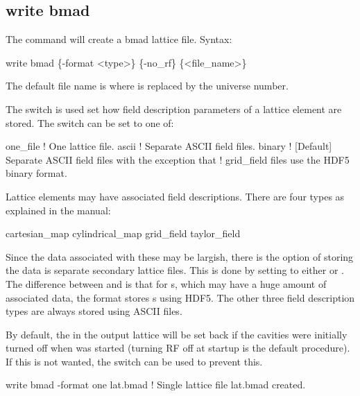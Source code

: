 {{{{{{{{{{{%

\subsection{write bmad}
\label{s:write.bmad}

The  command will create a bmad lattice file. Syntax:
\begin{example}
    write bmad \{-format <type>\} \{-no_rf\} \{<file_name>\} 
\end{example}

The default file name is  where \vn{\#} is replaced by the universe number. 

The  switch is used set how field description parameters of a lattice element
are stored. The  switch can be set to one of:
\begin{example}
  one_file      ! One lattice file.
  ascii         ! Separate ASCII field files.
  binary        ! [Default] Separate ASCII field files with the exception that
                !   grid_field files use the HDF5 binary format.
\end{example}
Lattice elements may have associated field descriptions. There are four types as explained in the
\bmad manual:
\begin{example}
  cartesian_map
  cylindrical_map
  grid_field
  taylor_field
\end{example}
Since the data associated with these may be largish, there is the option of storing the data is
separate secondary lattice files. This is done by setting  to either  or
. The difference between  and  is that for s, which
may have a huge amount of associated data, the  format stores s using
HDF5. The other three field description types are always stored using ASCII files.

By default, the  in the output lattice will be set back  if the cavities were
initially turned off when \tao was started (turning RF off at startup is the default procedure). If
this is not wanted, the  switch can be used to prevent this.

\begin{example}
  write bmad -format one lat.bmad  ! Single lattice file lat.bmad created.
\end{example}


}}}}}}}}}}}
